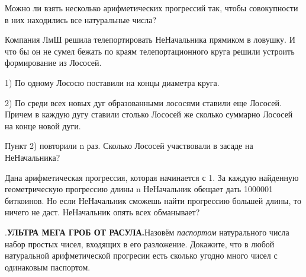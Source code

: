 \newpage

Можно ли взять несколько арифметических прогрессий так, чтобы совокупности в них находились все натуральные числа?

Компания ЛмШ решила телепортировать НеНачальника прямиком в ловушку. И что бы он не сумел бежать по краям телепортационного круга решили устроить формирование из Лососей.

1) По одному Лососю поставили на концы диаметра круга.

2) По среди всех новых дуг образованными лососями ставили еще Лососей. Причем в каждую дугу ставили столько Лососей же сколько суммарно Лососей на конце новой дуги.

Пункт 2) повторили n раз. Сколько Лососей участвовали в засаде на НеНачальника?

Дана арифметическая прогрессия, которая начинается с 1. За каждую найденную геометрическую прогрессию длины n НеНачальник обещает дать 1000001 биткоинов. Но если НеНачальник сможешь найти прогрессию большей длины, то ничего не даст. НеНачальник опять всех обманывает?

\vspace{\baselineskip}

.\textbf{\Huge УЛЬТРА МЕГА ГРОБ ОТ РАСУЛА.}Назовём \textit{паспортом} натурального числа набор простых чисел, входящих в его разложение. Докажите, что в любой натуральной арифметической прогресии есть сколько угодно много чисел с одинаковым паспортом.